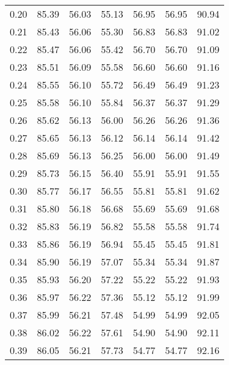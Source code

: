 \begin{tabular}{|c|c|c|c|c|c|c|}
      0.20 &     85.39 &     56.03 &      55.13 &   56.95 &      56.95 &         90.94 \\
      0.21 &     85.43 &     56.06 &      55.30 &   56.83 &      56.83 &         91.02 \\
      0.22 &     85.47 &     56.06 &      55.42 &   56.70 &      56.70 &         91.09 \\
      0.23 &     85.51 &     56.09 &      55.58 &   56.60 &      56.60 &         91.16 \\
      0.24 &     85.55 &     56.10 &      55.72 &   56.49 &      56.49 &         91.23 \\
      0.25 &     85.58 &     56.10 &      55.84 &   56.37 &      56.37 &         91.29 \\
      0.26 &     85.62 &     56.13 &      56.00 &   56.26 &      56.26 &         91.36 \\
      0.27 &     85.65 &     56.13 &      56.12 &   56.14 &      56.14 &         91.42 \\
      0.28 &     85.69 &     56.13 &      56.25 &   56.00 &      56.00 &         91.49 \\
      0.29 &     85.73 &     56.15 &      56.40 &   55.91 &      55.91 &         91.55 \\
      0.30 &     85.77 &     56.17 &      56.55 &   55.81 &      55.81 &         91.62 \\
      0.31 &     85.80 &     56.18 &      56.68 &   55.69 &      55.69 &         91.68 \\
      0.32 &     85.83 &     56.19 &      56.82 &   55.58 &      55.58 &         91.74 \\
      0.33 &     85.86 &     56.19 &      56.94 &   55.45 &      55.45 &         91.81 \\
      0.34 &     85.90 &     56.19 &      57.07 &   55.34 &      55.34 &         91.87 \\
      0.35 &     85.93 &     56.20 &      57.22 &   55.22 &      55.22 &         91.93 \\
      0.36 &     85.97 &     56.22 &      57.36 &   55.12 &      55.12 &         91.99 \\
      0.37 &     85.99 &     56.21 &      57.48 &   54.99 &      54.99 &         92.05 \\
      0.38 &     86.02 &     56.22 &      57.61 &   54.90 &      54.90 &         92.11 \\
      0.39 &     86.05 &     56.21 &      57.73 &   54.77 &      54.77 &         92.16 \\

\end{tabular}
